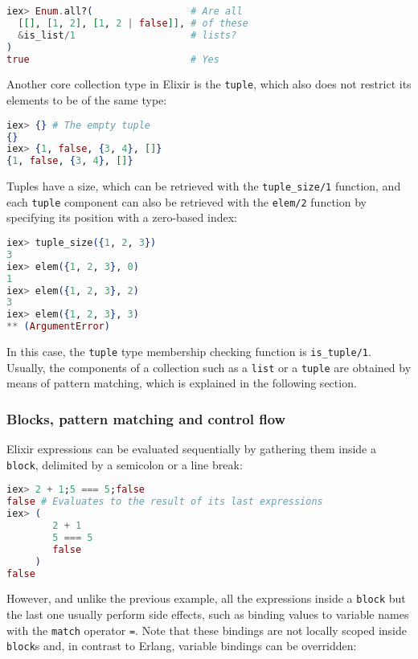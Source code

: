 \begin{lstlisting}[language=elixir,numbers=none,frame=none]
iex> Enum.all?(                 # Are all
  [[], [1, 2], [1, 2 | false]], # of these
  &is_list/1                    # lists?
)
true                            # Yes
\end{lstlisting}

Another core collection type in Elixir is the \verb|tuple|, which also does not
restrict its elements to be of the same type:

\begin{lstlisting}[language=elixir,numbers=none,frame=none]
iex> {} # The empty tuple
{}
iex> {1, false, {3, 4}, []}
{1, false, {3, 4}, []}
\end{lstlisting}

Tuples have a size, which can be retrieved with the \verb|tuple_size/1|
function, and each \verb|tuple| component can also be retrieved with the
\verb|elem/2| function by specifying its position with a zero-based index:

\begin{lstlisting}[language=elixir,numbers=none,frame=none]
iex> tuple_size({1, 2, 3})
3
iex> elem({1, 2, 3}, 0)
1
iex> elem({1, 2, 3}, 2)
3
iex> elem({1, 2, 3}, 3)
** (ArgumentError)
\end{lstlisting}

In this case, the \verb|tuple| type membership checking function is
\verb|is_tuple/1|. Usually, the components of a collection such as a \verb|list|
or a \verb|tuple| are obtained by means of pattern matching, which is explained
in the following section.

\subsubsection{Blocks, pattern matching and control flow}

Elixir expressions can be evaluated sequentially by gathering them inside a
\verb|block|, delimited by a semicolon or a line break:

\begin{lstlisting}[language=elixir,numbers=none,frame=none]
iex> 2 + 1;5 === 5;false
false # Evaluates to the result of its last expressions
iex> (
        2 + 1
        5 === 5
        false
     )
false
\end{lstlisting}

However, and unlike the previous example, all the expressions inside a
\verb|block| but the last one usually perform side effects, such as binding
values to variable names with the \verb|match| operator \verb|=|. Note that
these bindings are not locally scoped inside \verb|block|s and, in contrast to
Erlang, variable bindings can be overridden:

